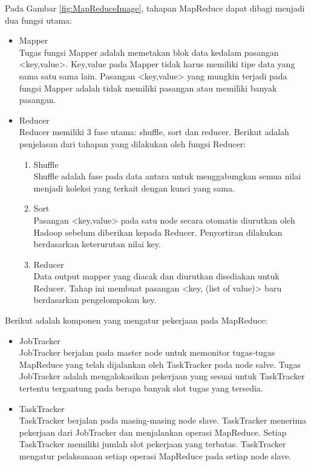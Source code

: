 \noindent Pada Gambar \ref{fig:MapReduceImage}, tahapan MapReduce dapat dibagi menjadi dua fungsi utama:

\begin{itemize}
\item Mapper\\
Tugas fungsi Mapper adalah memetakan blok data kedalam pasangan <key,value>. Key,value pada Mapper tidak harus memiliki tipe data yang sama satu sama lain. Pasangan <key,value> yang mungkin terjadi pada fungsi Mapper adalah tidak memiliki pasangan atau memiliki banyak pasangan.

\item Reducer\\
Reducer memiliki 3 fase utama: shuffle, sort dan reducer. Berikut adalah penjelasan dari tahapan yang dilakukan oleh fungsi Reducer:

\begin{enumerate}
\item Shuffle \\
Shuffle adalah fase pada data antara untuk menggabungkan semua nilai menjadi koleksi yang terkait dengan kunci yang sama.
\item Sort \\
Pasangan <key,value> pada satu node secara otomatis diurutkan oleh Hadoop sebelum diberikan kepada Reducer. Penyortiran dilakukan berdasarkan keterurutan nilai key. 
\item Reducer \\
Data output mapper yang diacak dan diurutkan disediakan untuk Reducer. Tahap ini membuat pasangan <key, (list of value)> baru berdasarkan pengelompokan key.
\end{enumerate}

\end{itemize}

\noindent Berikut adalah komponen yang mengatur pekerjaan pada MapReduce:

\begin{itemize}
\item JobTracker\\
JobTracker berjalan pada master node untuk memonitor tugas-tugas MapReduce yang telah dijalankan oleh TaskTracker pada node salve. Tugas JobTracker adalah mengalokasikan pekerjaan yang sesuai untuk TaskTracker tertentu tergantung pada berapa banyak slot tugas yang tersedia. 
\item TaskTracker\\
TaskTracker berjalan pada masing-masing node slave. TaskTracker menerima pekerjaan dari JobTracker dan menjalankan operasi MapReduce. Setiap TaskTracker memiliki jumlah slot pekerjaan yang terbatas. TaskTracker mengatur pelaksanaan setiap operasi MapReduce pada setiap node slave. 
\end{itemize}

